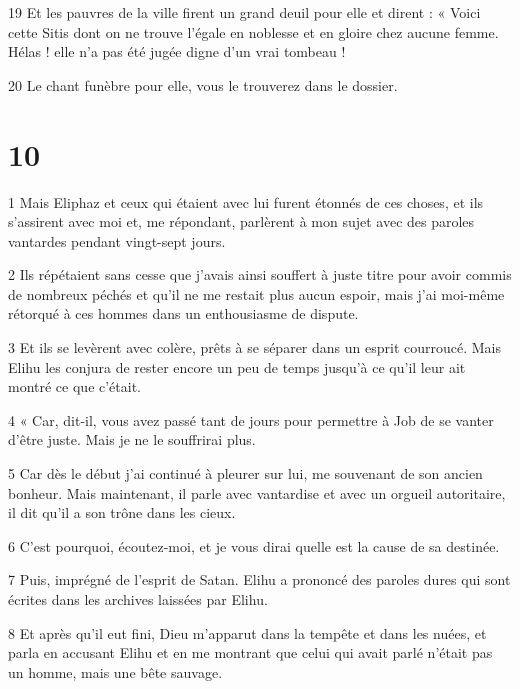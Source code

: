 \par 19 Et les pauvres de la ville firent un grand deuil pour elle et dirent : « Voici cette Sitis dont on ne trouve l'égale en noblesse et en gloire chez aucune femme. Hélas ! elle n’a pas été jugée digne d’un vrai tombeau !

\par 20 Le chant funèbre pour elle, vous le trouverez dans le dossier.

\chapter{10}

\par 1 Mais Eliphaz et ceux qui étaient avec lui furent étonnés de ces choses, et ils s'assirent avec moi et, me répondant, parlèrent à mon sujet avec des paroles vantardes pendant vingt-sept jours.

\par 2 Ils répétaient sans cesse que j'avais ainsi souffert à juste titre pour avoir commis de nombreux péchés et qu'il ne me restait plus aucun espoir, mais j'ai moi-même rétorqué à ces hommes dans un enthousiasme de dispute.

\par 3 Et ils se levèrent avec colère, prêts à se séparer dans un esprit courroucé. Mais Elihu les conjura de rester encore un peu de temps jusqu'à ce qu'il leur ait montré ce que c'était.

\par 4 « Car, dit-il, vous avez passé tant de jours pour permettre à Job de se vanter d'être juste. Mais je ne le souffrirai plus.

\par 5 Car dès le début j'ai continué à pleurer sur lui, me souvenant de son ancien bonheur. Mais maintenant, il parle avec vantardise et avec un orgueil autoritaire, il dit qu'il a son trône dans les cieux.

\par 6 C'est pourquoi, écoutez-moi, et je vous dirai quelle est la cause de sa destinée.

\par 7 Puis, imprégné de l'esprit de Satan. Elihu a prononcé des paroles dures qui sont écrites dans les archives laissées par Elihu.

\par 8 Et après qu'il eut fini, Dieu m'apparut dans la tempête et dans les nuées, et parla en accusant Elihu et en me montrant que celui qui avait parlé n'était pas un homme, mais une bête sauvage.

